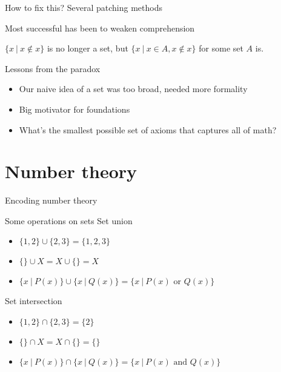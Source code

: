 \documentclass[xcolor=svgnames]{beamer}
\begin{document}
\begin{frame}{How to fix this?}
    Several patching methods
    
    Most successful has been to weaken comprehension
    \pause
    
    $\{x\ |\ x \notin x\}$ is no longer a set,
    but $\{x\ |\ x \in A, x \notin x\}$ for some set $A$ is. \pause

\end{frame}

\begin{frame}{Lessons from the paradox}
    \begin{itemize}
    \item Our naive idea of a set was too broad, needed more formality
    \item Big motivator for foundations
    \item What's the smallest possible set of axioms that captures all of math?

    \end{itemize}
\end{frame}

\section{Number theory}

\begin{frame}{}
    \begin{center}
    \Huge Encoding number theory
    \end{center}
\end{frame}

\begin{frame}{Some operations on sets}
    Set union \pause
    \begin{itemize}
    \item $\{1,2\} \cup \{2,3\} = \{1,2,3\}$
    \item $\{\} \cup X = X \cup \{\} = X$ \pause
    \item $\{x\ |\ P(x)\} \cup \{x\ |\ Q(x)\} = \{x\ |\ P(x) \text{ or } Q(x)\}$
    \end{itemize} \pause
    
    Set intersection \pause
    \begin{itemize}
    \item $\{1,2\} \cap \{2,3\} = \{2\}$
    \item $\{\} \cap X = X \cap \{\} = \{\}$ \pause
    \item $\{x\ |\ P(x)\} \cap \{x\ |\ Q(x)\} = \{x\ |\ P(x) \text{ and } Q(x)\}$
    \end{itemize}
\end{frame}
\end{document}
